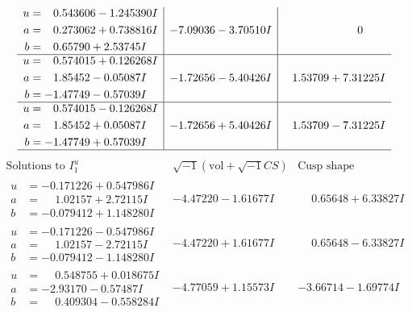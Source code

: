 \documentclass[1p]{elsarticle_modified}
\theoremstyle{definition}
\newcommand{\I}{\sqrt{-1}}
\begin{document}
$$\begin{array}{c|c|c}
\begin{aligned}
u &= \phantom{-}0.543606 - 1.245390 I \\
a &= \phantom{-}0.273062 + 0.738816 I \\
b &= \phantom{-}0.65790 + 2.53745 I\end{aligned}
 & -7.09036 - 3.70510 I & \phantom{-0.000000 } 0 \\ \hline\begin{aligned}
u &= \phantom{-}0.574015 + 0.126268 I \\
a &= \phantom{-}1.85452 - 0.05087 I \\
b &= -1.47749 - 0.57039 I\end{aligned}
 & -1.72656 - 5.40426 I & \phantom{-}1.53709 + 7.31225 I \\ \hline\begin{aligned}
u &= \phantom{-}0.574015 - 0.126268 I \\
a &= \phantom{-}1.85452 + 0.05087 I \\
b &= -1.47749 + 0.57039 I\end{aligned}
 & -1.72656 + 5.40426 I & \phantom{-}1.53709 - 7.31225 I\\
 \hline 
 \end{array}$$\newpage$$\begin{array}{c|c|c}  
\text{Solutions to }I^u_{1}& \I (\text{vol} + \sqrt{-1}CS) & \text{Cusp shape}\\
 \hline 
\begin{aligned}
u &= -0.171226 + 0.547986 I \\
a &= \phantom{-}1.02157 + 2.72115 I \\
b &= -0.079412 + 1.148280 I\end{aligned}
 & -4.47220 - 1.61677 I & \phantom{-}0.65648 + 6.33827 I \\ \hline\begin{aligned}
u &= -0.171226 - 0.547986 I \\
a &= \phantom{-}1.02157 - 2.72115 I \\
b &= -0.079412 - 1.148280 I\end{aligned}
 & -4.47220 + 1.61677 I & \phantom{-}0.65648 - 6.33827 I \\ \hline\begin{aligned}
u &= \phantom{-}0.548755 + 0.018675 I \\
a &= -2.93170 - 0.57487 I \\
b &= \phantom{-}0.409304 - 0.558284 I\end{aligned}
 & -4.77059 + 1.15573 I & -3.66714 - 1.69774 I \\ \hline\begin{aligned}

\end{aligned}
\end{array}$$
\end{document}
